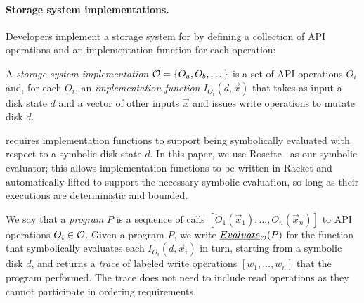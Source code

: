 \paragraph{Storage system implementations.}
Developers implement a storage system for \depsynth
by defining a collection of API operations \sys and an implementation function for each operation:
%
\begin{definition}\label{def:storage-system}
A \emph{storage system implementation} $\mathcal{O} = \{O_a, O_b, \dots\}$
is a set of API operations $O_i$ and,
for each $O_i$,
an \emph{implementation function} $I_{O_i}(d, \vec{x})$
that takes as input a disk state $d$ and a vector of other inputs $\vec{x}$
and issues write operations to mutate disk $d$.
\end{definition}
%
\noindent
\depsynth requires implementation functions to support being symbolically evaluated
with respect to a symbolic disk state $d$.
In this paper, we use Rosette~\cite{torlak:rosette} as our symbolic evaluator;
this allows implementation functions to be written in Racket
and automatically lifted to support the necessary symbolic evaluation,
so long as their executions are deterministic and bounded.

We say that a \emph{program} $P$ is a sequence of calls $[O_1(\vec{x}_1), \dots, O_n(\vec{x}_n)]$
to API operations $O_i \in \mathcal{O}$.
Given a program $P$,
we write $\emph{Evaluate}_{\mathcal{O}}(P)$ for the function that symbolically evaluates each $I_{O_i}(d, \vec{x}_i)$ in turn,
starting from a symbolic disk $d$,
and returns a \emph{trace} of labeled write operations $[w_1, \dots, w_n]$ that the program performed.
The trace does not need to include read operations
as they cannot participate in ordering requirements.


